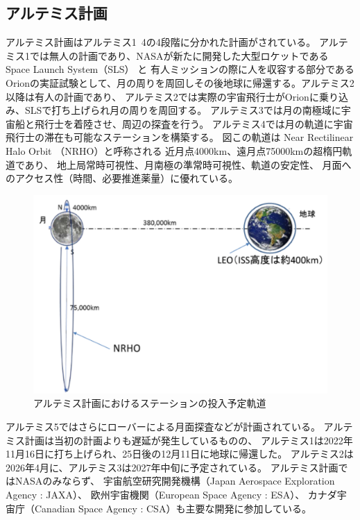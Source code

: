 \subsection{アルテミス計画}
\label{section:月・火星の探査計画}
アルテミス計画はアルテミス1~4の4段階に分かれた計画がされている。
アルテミス1では無人の計画であり、NASAが新たに開発した大型ロケットである
Space Launch System（SLS） と 有人ミッションの際に人を収容する部分である
Orionの実証試験として、月の周りを周回しその後地球に帰還する。アルテミス2以降は有人の計画であり、
アルテミス2では実際の宇宙飛行士がOrionに乗り込み、SLSで打ち上げられ月の周りを周回する。
アルテミス3では月の南極域に宇宙船と飛行士を着陸させ、周辺の探査を行う。
アルテミス4では月の軌道に宇宙飛行士の滞在も可能なステーションを構築する。
図この軌道は Near Rectilinear Halo Orbit （NRHO）と呼称される
近⽉点4000km、遠⽉点75000kmの超楕円軌道であり、
地上局常時可視性、月南極の準常時可視性、軌道の安定性、
月面へのアクセス性（時間、必要推進薬量）に優れている\cite{kiban_dai48}。
\begin{figure}[tbh]
    \centering
    \includegraphics[width=0.7\textheight]{img/artemis_moon_station_orbit.pdf}
    \caption{アルテミス計画におけるステーションの投入予定軌道}
    \label{fig:artemis_moon_station_orbit}
    \begin{minipage}{\textwidth}
        \raggedright
    \end{minipage}
\end{figure}

アルテミス5ではさらにローバーによる月面探査などが計画されている。
アルテミス計画は当初の計画よりも遅延が発生しているものの、
アルテミス1は2022年11月16日に打ち上げられ、25日後の12月11日に地球に帰還した。
アルテミス2は2026年4月に、アルテミス3は2027年中旬に予定されている。
アルテミス計画ではNASAのみならず、
宇宙航空研究開発機構（Japan Aerospace Exploration Agency : JAXA）、
欧州宇宙機関（European Space Agency : ESA）、
カナダ宇宙庁（Canadian Space Agency : CSA）も主要な開発に参加している。
\cite{jaxa2021}


